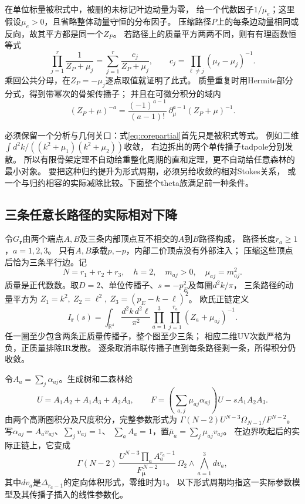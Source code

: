 \documentclass[11pt,a4paper]{ctexart}
\theoremstyle{cnplain}\newtheorem{theorem}{定理}[section]
\theoremstyle{definition}\newtheorem{definition}[theorem]{定义}
\theoremstyle{remark}\newtheorem{remark}[theorem]{注}
\begin{document}
在单位标量被积式中，被删的未标记叶边动量为零，
给一个代数因子$1/\mu_e$；这里假设$\mu_e>0$，且省略整体动量守恒的分布因子。
压缩路径$P$上的每条边动量相同或反向，故其平方都是同一个$Z_P$。
若路径上的质量平方两两不同，则有有理函数恒等式
\begin{equation}\label{eq:corepartial}
 \prod_{j=1}^{r}\frac1{Z_P+\mu_j}
 =\sum_{j=1}^{r}\frac{c_j}{Z_P+\mu_j},\qquad
 c_j=\prod_{\ell\ne j}(\mu_\ell-\mu_j)^{-1}.
\end{equation}
乘回公共分母，在$Z_P=-\mu_j$逐点取值就证明了此式。
质量重复时用Hermite部分分式，得到带幂次的骨架传播子；
并且在可微分积分的域内
\[
 (Z_P+\mu)^{-a}
 =\frac{(-1)^{a-1}}{(a-1)!}\,
       \partial_\mu^{a-1}(Z_P+\mu)^{-1}.
\]

必须保留一个分析与几何关口：式\eqref{eq:corepartial}首先只是被积式等式。
例如二维
$\int d^2k/((k^2+\mu_1)(k^2+\mu_2))$收敛，
右边拆出的两个单传播子tadpole分别发散。
所以有限骨架定理不自动给重整化周期的直和定理，更不自动给任意森林的最小对象。
要把这种归约提升为形式周期，必须另给收敛的相对Stokes关系，
或一个与归约相容的实际减除比较。下面整个theta族满足前一种条件。

\subsection{三条任意长路径的实际相对下降}
令$G_{\mathbf r}$由两个端点$A,B$及三条内部顶点互不相交的$A$到$B$路径构成，
路径长度$r_a\ge1$，$a=1,2,3$。
只有$A,B$承载$p,-p$，内部二价顶点没有外部注入；
压缩这些顶点后恰为三条平行边。记
\[
 N=r_1+r_2+r_3,\quad h=2,\quad
 m_{aj}>0,\quad\mu_{aj}=m_{aj}^2 .
\]
质量是正代数数。取$D=2$、单位传播子、$s=-p_E^2$及每圈$d^2k/\pi$，
三条路径的动量平方为
$Z_1=k^2,\ Z_2=\ell^2,\ Z_3=(p_E-k-\ell)^2$。
欧氏正链定义
\[
 I_{\mathbf r}(s)=
 \int_{\mathbb R^4}\frac{d^2k\,d^2\ell}{\pi^2}
       \prod_{a=1}^3\prod_{j=1}^{r_a}(Z_a+\mu_{aj})^{-1}.
\]
任一圈至少包含两条正质量传播子，整个图至少三条；
相应二维UV次数严格为负，正质量排除IR发散。
逐条取消串联传播子直到每条路径剩一条，所得积分仍收敛。

令$A_a=\sum_j\alpha_{aj}$。生成树和二森林给
\begin{equation}\label{eq:thetaUF}
 U=A_1A_2+A_1A_3+A_2A_3,\qquad
 F=\left(\sum_{a,j}\mu_{aj}\alpha_{aj}\right)U-sA_1A_2A_3 .
\end{equation}
由两个高斯圈积分及尺度积分，完整参数形式为
$\Gamma(N-2)U^{N-3}\Omega_{N-1}/F^{N-2}$。
写$\alpha_{aj}=A_av_{aj}$、$\sum_jv_{aj}=1$、
$\sum_a A_a=1$，置$\bar\mu_a=\sum_j\mu_{aj}v_{aj}$。
在边界吹起后的实际正链上，它变成
\begin{equation}\label{eq:thetaproduct}
 \Gamma(N-2)\,
 \frac{U^{N-3}\prod_a A_a^{r_a-1}}
      {F_{\bar{\boldsymbol\mu}}^{\,N-2}}\,
 \Omega_2\wedge\bigwedge_{a=1}^3 dv_a ,
\end{equation}
其中$dv_a$是$\Delta_{r_a-1}$的定向体积形式，零维时为$1$。
以下形式周期均指这一实际参数模型及其传播子插入的线性参数化。
\end{document}
